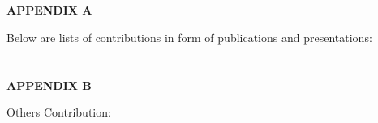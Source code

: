 \chapter*{}

\begin{center}
    \textbf{\LARGE APPENDIX A}
\end{center}

\vspace{1.5cm}  %

\noindent
Below are lists of contributions in form of publications and presentations: \\






\chapter*{}

\begin{center}
    \textbf{\LARGE APPENDIX B}
\end{center}

\vspace{1.5cm}  %

\noindent Others Contribution: \\

